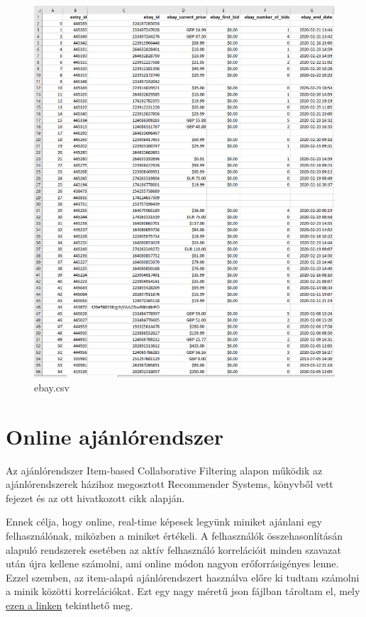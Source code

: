 \documentclass[14pt,a4paper]{article}
\begin{document}
\begin{figure}[H]
\centering
\includegraphics[width=1.0\columnwidth]{pics/csv_ebay.png}
\caption{ebay.csv}
\end{figure}

\section{Online ajánlórendszer}

Az ajánlórendszer Item-based Collaborative Filtering alapon működik az ajánlórendszerek házihoz megosztott
Recommender Systems, \cite{sammut_encyclopedia_2010} könyvből vett fejezet és az ott hivatkozott
\cite{linden_smith_york_2003} cikk alapján.

Ennek célja, hogy online, real-time képesek legyünk miniket ajánlani egy felhasználónak, miközben a miniket értékeli.
A felhasználók összehasonlításán alapuló rendszerek esetében az aktív felhasználó korrelációit minden szavazat után
újra kellene számolni, ami online módon nagyon erőforrásigényes lenne. Ezzel szemben, az item-alapú ajánlórendszert
használva előre ki tudtam számolni a minik közötti korrelációkat. Ezt egy nagy méretű json fájlban tároltam el,
mely
\href{https://raw.githubusercontent.com/nemkin/cool-mini-or-not/main/data/correlations.json}{ezen a linken}
tekinthető meg.
\end{document}

